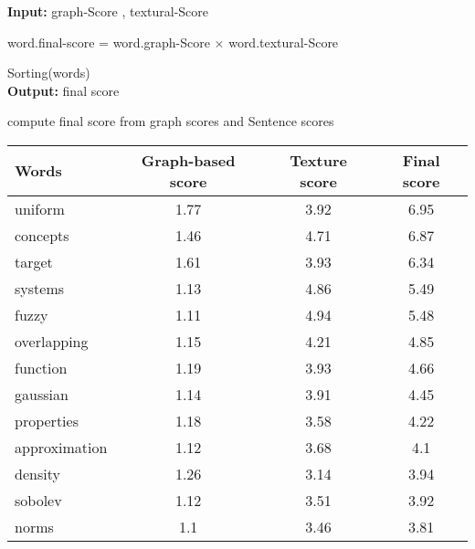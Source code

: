 \documentclass[3p]{elsarticle}
\begin{document}
\begin{algorithm}
  \SetAlgoLined
  \textbf{Input:} graph-Score , textural-Score \\
  
   {

    word.final-score = word.graph-Score × word.textural-Score\\
}

Sorting(words)\\
\textbf{Output:} final score
 
 \caption{compute final score from graph scores and Sentence scores}
 \label{alg:scores-computation}
\end{algorithm}

\begin{tcolorbox}
\begin{center}
        \begin{tabular}{lccc}
            \hline
            \textbf{Words}  &\textbf{Graph-based score} &\textbf{Texture score}  &\textbf{Final score} \\
            \hline
            uniform                & 1.77   & 3.92    & 6.95  \\
            concepts               & 1.46   & 4.71    & 6.87  \\
            target                 & 1.61   & 3.93    & 6.34  \\
            systems                & 1.13   & 4.86    & 5.49  \\
            fuzzy                  & 1.11   & 4.94    & 5.48  \\
            overlapping            & 1.15   & 4.21    & 4.85  \\
            function               & 1.19   & 3.93    & 4.66  \\
            gaussian               & 1.14   & 3.91    & 4.45  \\
            properties             & 1.18   & 3.58    & 4.22  \\
            approximation          & 1.12   & 3.68    & 4.1   \\
            density                & 1.26   & 3.14    & 3.94  \\
            sobolev                & 1.12   & 3.51    & 3.92  \\
            norms                  & 1.1    & 3.46    & 3.81  \\

\end{tabular}
\end{center}
\end{tcolorbox}
\end{document}

